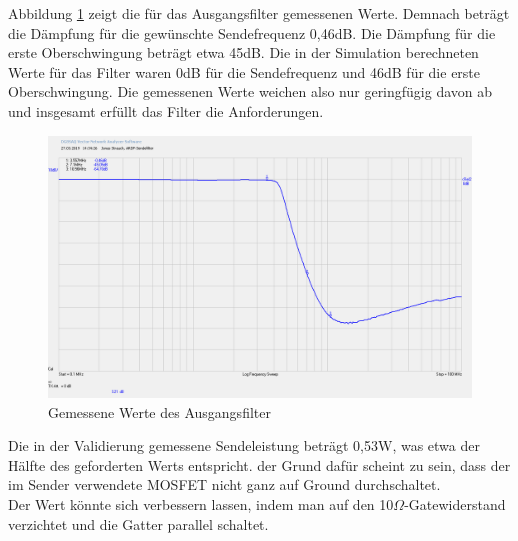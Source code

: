 Abbildung \ref{filter} zeigt die für das Ausgangsfilter gemessenen Werte. Demnach beträgt die Dämpfung für die gewünschte Sendefrequenz 0,46dB. Die Dämpfung für die erste Oberschwingung beträgt etwa 45dB. Die in der Simulation berechneten Werte für das Filter waren 0dB für die Sendefrequenz und 46dB für die erste Oberschwingung. Die gemessenen Werte weichen also nur geringfügig davon ab und insgesamt erfüllt das Filter die Anforderungen.\\
\begin{figure}[H]\centering
	\includegraphics[width=16cm]{res/Filterwerte.png}
	\caption{Gemessene Werte des Ausgangsfilter}
	\label{filter}
\end{figure}

Die in der Validierung gemessene Sendeleistung beträgt 0,53W, was etwa der Hälfte des geforderten Werts entspricht. der Grund dafür scheint zu sein, dass der im Sender verwendete MOSFET nicht ganz auf Ground durchschaltet.\\
Der Wert könnte sich verbessern lassen, indem man auf den 10$\Omega$-Gatewiderstand verzichtet und die Gatter parallel schaltet.
